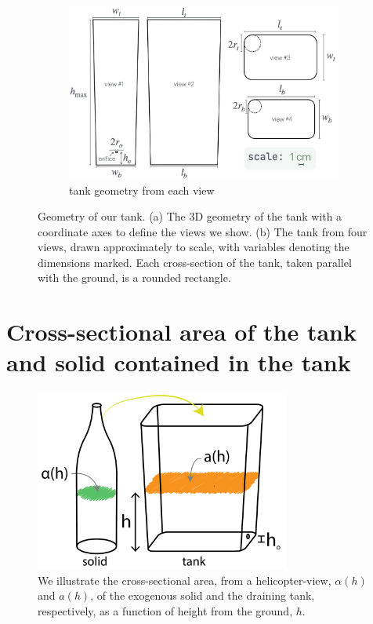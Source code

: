 \documentclass[a4paper,fleqn]{cas-sc}
\begin{document}
\begin{figure}[h!]
	\begin{subfigure}[b]{0.8\textwidth}
		\includegraphics[width=\textwidth]{../drawings_and_photos/tank_geometry.png} \caption{tank geometry from each view}
	\end{subfigure}
	\caption{Geometry of our tank. 
	(a) The 3D geometry of the tank with a coordinate axes to define the views we show. (b) The tank from four views, drawn approximately to scale, with variables denoting the dimensions marked. Each cross-section of the tank, taken parallel with the ground, is a rounded rectangle.
	}
\end{figure}

\clearpage

\section{Cross-sectional area of the tank and solid contained in the tank}

\begin{figure}[h!]
	\centering
	\includegraphics[width=0.75\textwidth]{../drawings_and_photos/a_of_h.pdf} 
	\caption{We illustrate the cross-sectional area, from a helicopter-view, $\alpha(h)$ and $a(h)$, of the exogenous solid and the draining tank, respectively, as a function of height from the ground, $h$.}
\end{figure}
\end{document}
